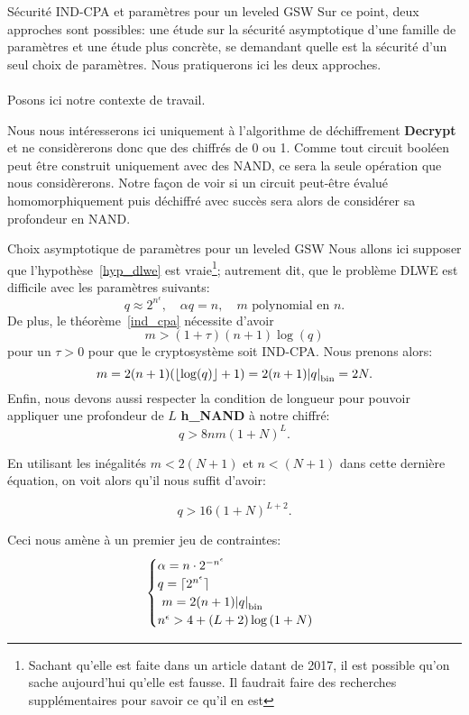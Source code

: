 \begin{section}{Sécurité IND-CPA et paramètres pour un leveled GSW}
Sur ce point, deux approches sont possibles: une étude sur la sécurité asymptotique d'une famille 
de paramètres et une étude plus concrète, se demandant quelle est la sécurité d'un seul choix de paramètres. 
Nous pratiquerons ici les deux approches.

\paragraph{}
Posons ici notre contexte de travail.

Nous nous intéresserons ici uniquement à l'algorithme de déchiffrement
\textbf{Decrypt} et ne considèrerons donc que des chiffrés de 0 ou 1. Comme tout circuit booléen peut être construit uniquement avec des NAND, ce sera la seule opération
que nous considèrerons. Notre façon de voir si un circuit peut-être évalué homomorphiquement puis déchiffré
avec succès sera alors de considérer sa profondeur en NAND.

\begin{subsection}{Choix asymptotique de paramètres pour un leveled GSW}
\label{sec:leveled}
\label{param_leveled}
	Nous allons ici supposer que l'hypothèse~\ref{hyp_dlwe} est vraie\footnote{Sachant qu'elle est faite dans un 
	article datant de 2017, il est possible qu'on sache aujourd'hui qu'elle est fausse. Il faudrait faire des
	recherches supplémentaires
	pour savoir ce qu'il en est}; autrement dit, que le problème DLWE est difficile avec les paramètres suivants:
\[ q \approx 2^{n^\epsilon},\quad \alpha q = n,\quad \text{$m$ polynomial en $n$}.\]
De plus, le théorème~\ref{ind_cpa} nécessite d'avoir 
\[m > (1+\tau)(n+1)\log(q) \]
pour un $\tau > 0$ pour que le cryptosystème soit IND-CPA.  Nous prenons alors: 
\[ m = 2(n+1)(\lfloor \log(q) \rfloor + 1) = 2(n+1) {|q|}_{\text{bin}} = 2N.\]
Enfin, nous devons aussi respecter la condition de longueur pour pouvoir appliquer une profondeur de $L$ \textbf{h\_NAND} à notre chiffré:
\[q > 8nm (1 + N)^L. \]

En utilisant les inégalités $m < 2 (N+1)$ et $n < (N+1)$ dans cette dernière équation, on voit alors qu'il nous suffit d'avoir:

\begin{equation*}
q > 16 {(1+N)}^{L+2}.
\end{equation*}

Ceci nous amène à un premier jeu de contraintes: 
\[ \begin{cases}\alpha  = n \cdot 2^{-n^\epsilon}  \\
	q = \lceil 2^{n^\epsilon}\rceil\\ 
	m = 2(n+1)\bnorm{q} \\  
	n^\epsilon > 4 + (L+2) \log\left( 1 + N\right)
	\end{cases} \]


\end{subsection}
\end{section}
